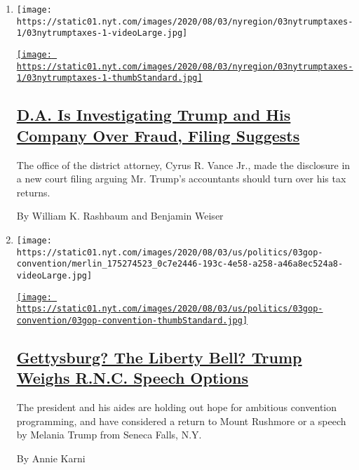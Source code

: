\begin{enumerate}
\def\labelenumi{\arabic{enumi}.}
\item
  \texttt{[image: https://static01.nyt.com/images/2020/08/03/nyregion/03nytrumptaxes-1/03nytrumptaxes-1-videoLarge.jpg]}

  \href{/2020/08/03/nyregion/donald-trump-taxes-cyrus-vance.html}{\texttt{[image: https://static01.nyt.com/images/2020/08/03/nyregion/03nytrumptaxes-1/03nytrumptaxes-1-thumbStandard.jpg]}}

  \hypertarget{da-is-investigating-trump-and-his-company-over-fraud-filing-suggests}{%
  \subsection{\texorpdfstring{\href{/2020/08/03/nyregion/donald-trump-taxes-cyrus-vance.html}{D.A.
  Is Investigating Trump and His Company Over Fraud, Filing
  Suggests}}{D.A. Is Investigating Trump and His Company Over Fraud, Filing Suggests}}\label{da-is-investigating-trump-and-his-company-over-fraud-filing-suggests}}

  The office of the district attorney, Cyrus R. Vance Jr., made the
  disclosure in a new court filing arguing Mr. Trump's accountants
  should turn over his tax returns.

  By William K. Rashbaum and Benjamin Weiser
\item
  \texttt{[image: https://static01.nyt.com/images/2020/08/03/us/politics/03gop-convention/merlin\_175274523\_0c7e2446-193c-4e58-a258-a46a8ec524a8-videoLarge.jpg]}

  \href{/2020/08/03/us/politics/trump-rnc-speech.html}{\texttt{[image: https://static01.nyt.com/images/2020/08/03/us/politics/03gop-convention/03gop-convention-thumbStandard.jpg]}}

  \hypertarget{gettysburg-the-liberty-bell-trump-weighs-rnc-speech-options}{%
  \subsection{\texorpdfstring{\href{/2020/08/03/us/politics/trump-rnc-speech.html}{Gettysburg?
  The Liberty Bell? Trump Weighs R.N.C. Speech
  Options}}{Gettysburg? The Liberty Bell? Trump Weighs R.N.C. Speech Options}}\label{gettysburg-the-liberty-bell-trump-weighs-rnc-speech-options}}

  The president and his aides are holding out hope for ambitious
  convention programming, and have considered a return to Mount Rushmore
  or a speech by Melania Trump from Seneca Falls, N.Y.

  By Annie Karni
\end{enumerate}

